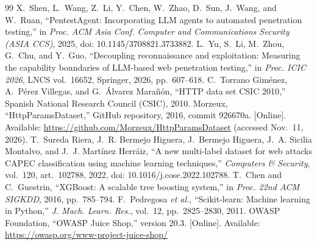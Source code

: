 \documentclass[conference]{IEEEtran}
\begin{document}
\begin{thebibliography}{99}
 X.~Shen, L.~Wang, Z.~Li, Y.~Chen, W.~Zhao, D.~Sun, J.~Wang, and W.~Ruan, ``PentestAgent: Incorporating LLM agents to automated penetration testing,'' in \emph{Proc. ACM Asia Conf. Computer and Communications Security (ASIA CCS)}, 2025, doi: 10.1145/3708821.3733882.
 L.~Yu, S.~Li, M.~Zhou, G.~Chu, and Y.~Guo, ``Decoupling reconnaissance and exploitation: Measuring the capability boundaries of LLM-based web penetration testing,'' in \emph{Proc. ICIC 2026}, LNCS vol.~16652, Springer, 2026, pp.~607--618.
 C.~Torrano Gim\'enez, A.~P\'erez Villegas, and G.~\'Alvarez Mara\~n\'on, ``HTTP data set CSIC 2010,'' Spanish National Research Council (CSIC), 2010.
 Morzeux, ``HttpParamsDataset,'' GitHub repository, 2016, commit 926670a. [Online]. Available: \url{https://github.com/Morzeux/HttpParamsDataset} (accessed Nov.~11, 2026).
 T.~Sureda Riera, J.~R. Bermejo Higuera, J.~Bermejo Higuera, J.~A. Sicilia Montalvo, and J.~J. Mart\'inez Herr\'aiz, ``A new multi-label dataset for web attacks CAPEC classification using machine learning techniques,'' \emph{Computers \& Security}, vol.~120, art.~102788, 2022, doi: 10.1016/j.cose.2022.102788.
 T.~Chen and C.~Guestrin, ``XGBoost: A scalable tree boosting system,'' in \emph{Proc. 22nd ACM SIGKDD}, 2016, pp.~785--794.
 F.~Pedregosa \emph{et al.}, ``Scikit-learn: Machine learning in Python,'' \emph{J. Mach. Learn. Res.}, vol.~12, pp.~2825--2830, 2011.
 OWASP Foundation, ``OWASP Juice Shop,'' version 20.3. [Online]. Available: \url{https://owasp.org/www-project-juice-shop/}
\end{thebibliography}
\end{document}
